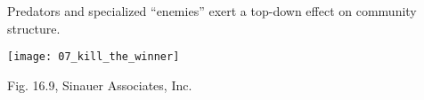 \documentclass[t]{beamer}
\begin{document}
%
\begin{frame}[t]{Predators and specialized ``enemies'' exert a top-down effect on community structure.}

	\vspace*{-0.5\baselineskip}
	\begin{center}
		\texttt{[image: 07\_kill\_the\_winner]}
	\end{center}
	\vfilll
	
	\hfill \tiny Fig. 16.9, \textcopyright Sinauer Associates, Inc.
\end{frame}

%
\end{document}
